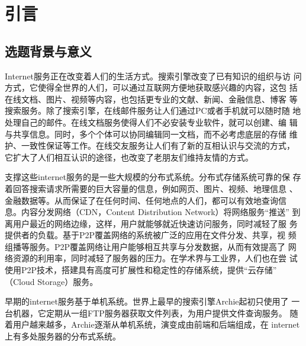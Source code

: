 \chapter{引言}
\label{chap:intro}

\section{选题背景与意义}




Internet服务正在改变着人们的生活方式。搜索引擎改变了已有知识的组织与访
问方式，它使得全世界的人们，可以通过互联网方便地获取感兴趣的内容，这包
括在线文档、图片、视频等内容，也包括更专业的文献、新闻、金融信息、博客
等搜索服务。除了搜索引擎，在线邮件服务让人们通过PC或者手机就可以随时随
地处理自己的邮件。在线文档服务使得人们不必安装专业软件，就可以创建、编
辑与共享信息。同时，多个个体可以协同编辑同一文档，而不必考虑底层的存储
维护、一致性保证等工作。在线交友服务让人们有了新的互相认识与交流的方式，
它扩大了人们相互认识的途径，也改变了老朋友们维持友情的方式。


支撑这些internet服务的是一些大规模的分布式系统。分布式存储系统可靠的保
存着回答搜索请求所需要的巨大容量的信息，例如网页、图片、视频、地理信息
、金融数据等。从而保证了在任何时间、任何地点的人们，都可以有效地查询信
息。内容分发网络（CDN，Content Distribution Network）将网络服务“推送”
到离用户最近的网络边缘，这样，用户就能够就近快速访问服务，同时减轻了服
务提供者的负载。基于P2P覆盖网络的系统被广泛的应用在文件分发、共享，视
频组播等服务。P2P覆盖网络让用户能够相互共享与分发数据，从而有效提高了
网络资源的利用率，同时减轻了服务器的压力。在学术界与工业界，人们也在尝
试使用P2P技术，搭建具有高度可扩展性和稳定性的存储系统，提供“云存储”
（Cloud Storage）服务。

早期的internet服务基于单机系统。世界上最早的搜索引擎Archie起初只使用了
一台机器，它定期从一组FTP服务器获取文件列表，为用户提供文件查询服务。
随着用户越来越多，Archie逐渐从单机系统，演变成由前端和后端组成，在
internet上有多处服务器的分布式系统。

